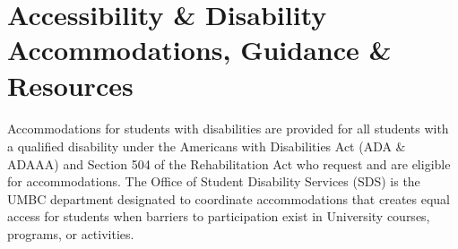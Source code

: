 \documentclass[letter,11pt]{article}
\begin{document}



\section*{Accessibility \& Disability Accommodations, Guidance \& Resources}
\paragraph{}Accommodations for students with disabilities are provided for all students with a qualified disability under the Americans with Disabilities Act (ADA \& ADAAA) and Section 504 of the Rehabilitation Act who request and are eligible for accommodations. The Office of Student Disability Services (SDS) is the UMBC department designated to coordinate accommodations that creates equal access for students when barriers to participation exist in University courses, programs, or activities.
\end{document}
